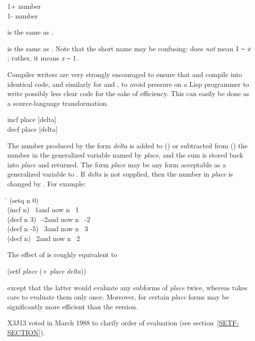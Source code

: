 \begin{defun}[Function]
1+ number \\
1- number

 is the same as .

 is the same as .
Note that the short name may be confusing:  does \emph{not} mean
$1-\emph{x}$; rather, it means $\emph{x}-1$.

\beforenoterule
\begin{implementation}
Compiler writers are very strongly encouraged to ensure
that  and  compile into identical code, and
similarly for  and , to avoid pressure on a Lisp
programmer to write possibly less clear code for the sake of efficiency.
This can easily be done as a source-language transformation.
\end{implementation}
\afternoterule
\end{defun}

\begin{defmac}
incf place [delta] \\
decf place [delta]

The number produced by the form \emph{delta}
is added to () or subtracted from ()
the number in the generalized variable named by \emph{place},
and the sum is stored back into \emph{place} and returned.
The form \emph{place} may be any form acceptable
as a generalized variable to .
If \emph{delta} is not supplied, then the number in \emph{place} is changed
by .
For example:
\begin{lisp}
\hskip 9pc\=\kill
(setq n 0) \\
(incf n) \EV\ 1\>\textrm{and now} n \EV\ 1 \\
(decf n 3) \EV\ -2\>\textrm{and now} n \EV\ -2 \\
(decf n -5) \EV\ 3\>\textrm{and now} n \EV\ 3 \\
(decf n) \EV\ 2\>\textrm{and now} n \EV\ 2
\end{lisp}
The effect of 
is roughly equivalent to
\begin{lisp}
(setf \emph{place} (+ \emph{place} \emph{delta}))
\end{lisp}
except that the latter would evaluate any subforms of \emph{place}
twice, whereas  takes care to evaluate them only once.
Moreover, for certain \emph{place} forms  may be
significantly more efficient than the  version.
\begin{newer}
X3J13 voted in March 1988 
to clarify order of evaluation (see section~\ref{SETF-SECTION}).
\end{newer}
\end{defmac}

